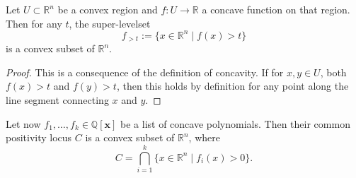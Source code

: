 \documentclass[sigconf, nonacm]{acmart} %
\begin{document}
\begin{lemma}\label{lemma:superlevelsets}
    Let $U \subset \mathbb{R}^n$ be a convex region and $f: U \rightarrow \mathbb{R}$ a concave function on that region. Then for any $t$, the super-levelset
    \begin{equation}
        f_{>t} := \{x \in \mathbb{R}^n \mid f(x) > t\}
    \end{equation}
    is a convex subset of $\mathbb{R}^n$.
\end{lemma}
\begin{proof}
    This is a consequence of the definition of concavity. If for $x,y \in U$, both $f(x)>t$ and $f(y)>t$, then this holds by definition for any point along the line segment connecting $x$ and $y$.
\end{proof}
Let now $f_1,\ldots, f_k \in \mathbb{Q}[\mathbf{x}]$ be a list of concave polynomials. Then their common positivity locus $C$ is a convex subset of $\mathbb{R}^n$, where
\begin{equation}\label{eq:setupC}
    C = \bigcap^k_{i=1}\{x\in \mathbb R^n \mid f_i(x) > 0\}.
\end{equation}
\end{document}
